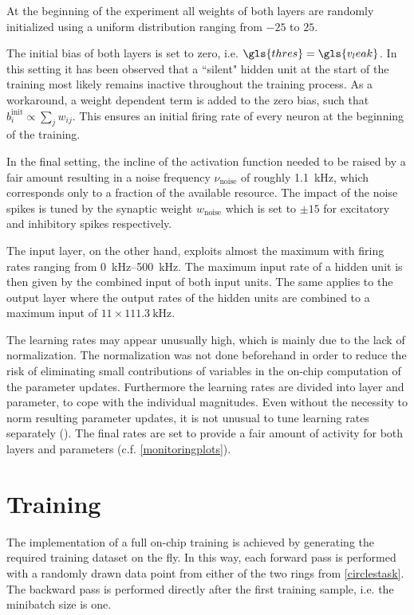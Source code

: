 At the beginning of the experiment all weights of both layers are randomly initialized using a uniform distribution ranging from $-25$ to $25$. 

The initial bias of both layers is set to zero, i.e. $\gls{thres} = \gls{v_leak}$. In this setting it has been observed that a ``silent" hidden unit at the start of the training most likely remains inactive throughout the training process. As a workaround, a weight dependent term is added to the zero bias, such that $b_i^\text{init} \propto \sum_j w_{ij}$. This ensures an initial firing rate of every neuron at the beginning of the training.

In the final setting, the incline of the activation function needed to be raised by a fair amount resulting in a noise frequency $\nu_\text{noise}$ of roughly \SI{1.1}{\kilo \Hz}, which corresponds only to a fraction of the available resource. The impact of the noise spikes is tuned by the synaptic weight $w_\text{noise}$ which is set to $\pm 15$ for excitatory and inhibitory spikes respectively.

The input layer, on the other hand, exploits almost the maximum with firing rates ranging from \SIrange{0}{500}{\kilo \Hz}. The maximum input rate of a hidden unit is then given by the combined input of both input units. The same applies to the output layer where the output rates of the hidden units are combined to a maximum input of $11 \times \SI{111.3}{\kilo \Hz}$.

The learning rates may appear unusually high, which is mainly due to the lack of normalization. The normalization was not done beforehand in order to reduce the risk of eliminating small contributions of variables in the on-chip computation of the parameter updates. Furthermore the learning rates are divided into layer and parameter, to cope with the individual magnitudes. Even without the necessity to norm resulting parameter updates, it is not unusual to tune learning rates separately (\citealp{Goodfellow-et-al-2016}). The final rates are set to provide a fair amount of activity for both layers and parameters (c.f. \cref{monitoringplots}).

\section{Training}
The implementation of a full on-chip training is achieved by generating the required training dataset on the fly. In this way, each forward pass is performed with a randomly drawn data point from either of the two rings from \cref{circlestask}. The backward pass is performed directly after the first training sample, i.e. the minibatch size is one.

